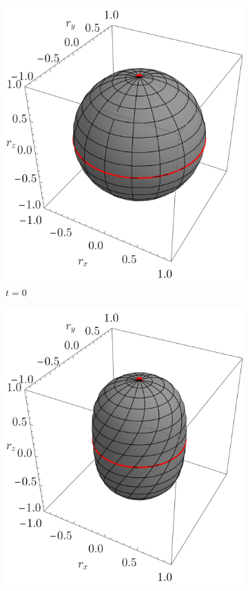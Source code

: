 \begin{figure}[ht!]
    \centering
    \begin{subfigure}{0.32\textwidth}
      \centering
      \includegraphics[width=0.9\linewidth]{chapter4/figures_special/sphere_Ising_t=0._z=0.9_p=0.5.png}
      \caption{$t=0$}
    \end{subfigure}%
    \begin{subfigure}{0.32\textwidth}
      \centering
      \includegraphics[width=0.9\linewidth]{chapter4/figures_special/sphere_Ising_t=0.5_z=0.9_p=0.5.png}

\end{subfigure}
\end{figure}
